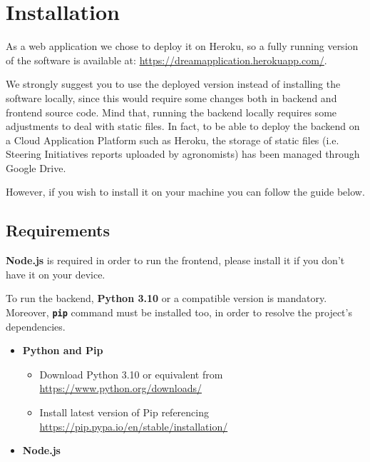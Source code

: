 \documentclass[table, 12pt]{article}
\begin{document}


\section{Installation}
As a web application we chose to deploy it on Heroku, so
a fully running version of the software is available at:
\url{https://dreamapplication.herokuapp.com/}.

We strongly suggest you to use the deployed version instead of installing the software locally, since this would require some changes both in backend and frontend source code.
Mind that, running the backend locally requires some adjustments to deal with static files. In fact, to be able to deploy the backend on a Cloud Application Platform such as Heroku, the storage of static files (i.e. Steering Initiatives reports uploaded by agronomists) has been managed through Google Drive. 

However, if you wish to install it on your machine you can follow the guide below. 

\subsection{Requirements}
\textbf{Node.js} is required in order to run the frontend, please install it if you don't
have it on your device.

To run the backend, \textbf{Python 3.10} or a compatible version is mandatory. Moreover, \texttt{\textbf{pip}} command must be installed too, in order to resolve the project's dependencies.

\begin{itemize}
    \item \textbf{Python and Pip}
    \begin{itemize}
        \item Download Python 3.10 or equivalent from \url{https://www.python.org/downloads/}
        \item Install latest version of Pip referencing \url{https://pip.pypa.io/en/stable/installation/}
    \end{itemize}
    \item \textbf{Node.js}
\end{itemize}
\end{document}
